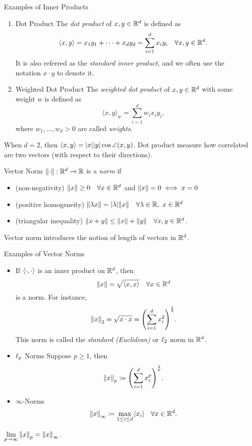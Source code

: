 \begin{eg}{Examples of Inner Products}
	\begin{enumerate}
		\item \begin{df}{Dot Product} The \textit{dot product} of $x,y\in{\mathbb{R}}^d$ is defined as \[\langle x,y\rangle=x_1y_1+\cdots+x_dy_d=\sum_{i=1}^dx_iy_i\quad\forall x,y\in{\mathbb{R}}^d.\] It is also referred as the \textit{standard inner product}, and we often use the notation $x\cdot y$ to denote it. \end{df}
		\item \begin{df}{Weighted Dot Product} The \textit{weighted dot product} of $x,y\in{\mathbb{R}}^d$ with some weight $w$ is defined as \[\langle x,y\rangle_w=\sum_{i=1}^dw_ix_iy_i,\] where $w_1,\dots,w_d>0$ are called \textit{weights}.\end{df}
	\end{enumerate}	
	\begin{rmk}
		When $d=2$, then $\langle x,y\rangle=\abs{x}\abs{y}\cos\angle(x,y)$. Dot product measure how correlated are two vectors (with respect to their directions). 	
	\end{rmk}
\end{eg}
\begin{df}{Vector Norm}
	$\norm{\cdot}:{\mathbb{R}}^d\to{\mathbb{R}}$ is a \textit{norm} if
	\begin{itemize}
		\item (non-negativity) $\norm{x}\geq0\quad\forall x\in{\mathbb{R}}^d$ and $\norm{x}=0\iff x=0$
		\item (positive homogeneity) $\norm{\lambda x}=\abs{\lambda}\norm{x}\quad\forall\lambda\in\R,\ x\in\R^d$
		\item (triangular inequality) $\norm{x+y}\leq\norm{x}+\norm{y}\quad\forall x,y\in{\mathbb{R}}^d$.
	\end{itemize}
\end{df}
\begin{rmk}
	Vector norm introduces the notion of length of vectors in ${\mathbb{R}}^d$.	
\end{rmk}
\begin{eg}{Examples of Vector Norms}
	\begin{itemize}
		\item If $\left\langle \cdot, \cdot \right\rangle$ is an inner product on ${\mathbb{R}}^d$, then \[\norm{x}=\sqrt{\left\langle x, x \right\rangle}\quad\forall x\in{\mathbb{R}}^d\] is a norm. For instance, \[\norm{x}_2=\sqrt{x\cdot x}=\qty(\sum_{i=1}^dx_i^2)^{\frac{1}{2}}.\] This norm is called the \textit{standard (Euclidean)} or $\ell_2$ norm in ${\mathbb{R}}^d$.
		\item \begin{df}{$\ell_p$ Norms} Suppose $p\geq1$, then \[\norm{x}_p\coloneqq\qty(\sum_{i=1}^dx_i^p)^{\frac{1}{p}}.\]\end{df}
		\item \begin{df}{$\infty$-Norms}\[\norm{x}_\infty\coloneqq\max_{1\leq i\leq d}\abs{x_i}\quad\forall x\in{\mathbb{R}}^d.\]\end{df}
	\end{itemize}
	\begin{rmk}
		$\displaystyle\lim_{p\to\infty}\norm{x}_p=\norm{x}_{\infty}$.
	\end{rmk}
\end{eg}
